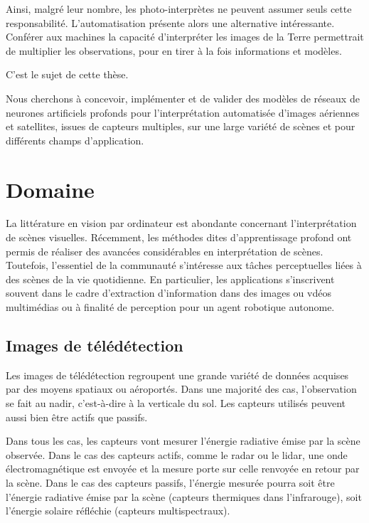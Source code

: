Ainsi, malgré leur nombre, les photo-interprètes ne peuvent assumer seuls cette responsabilité. L'automatisation présente alors une alternative intéressante. Conférer aux machines la capacité d'interpréter les images de la Terre permettrait de multiplier les observations, pour en tirer à la fois informations et modèles.

C'est le sujet de cette thèse.

Nous cherchons à concevoir, implémenter et de valider des modèles de réseaux de neurones artificiels profonds pour l'interprétation automatisée d'images aériennes et satellites, issues de capteurs multiples, sur une large variété de scènes et pour différents champs d'application.

\begin{figure}
    \centering
    \def\svgwidth{\columnwidth}
    
\end{figure}

\section{Domaine}

La littérature en vision par ordinateur est abondante concernant l'interprétation de scènes visuelles. Récemment, les méthodes dites d'apprentissage profond ont permis de réaliser des avancées considérables en interprétation de scènes. Toutefois, l'essentiel de la communauté s'intéresse aux tâches perceptuelles liées à des scènes de la vie quotidienne. En particulier, les applications s'inscrivent souvent dans le cadre d'extraction d'information dans des images ou vdéos multimédias ou à finalité de perception pour un agent robotique autonome.

\subsection{Images de télédétection}

Les images de télédétection regroupent une grande variété de données acquises par des moyens spatiaux ou aéroportés. Dans une majorité des cas, l'observation se fait au nadir, c'est-à-dire à la verticale du sol. Les capteurs utilisés peuvent aussi bien être actifs que passifs.

Dans tous les cas, les capteurs vont mesurer l'énergie radiative émise par la scène observée. Dans le cas des capteurs actifs, comme le radar ou le lidar, une onde électromagnétique est envoyée et la mesure porte sur celle renvoyée en retour par la scène. Dans le cas des capteurs passifs, l'énergie mesurée pourra soit être l'énergie radiative émise par la scène (capteurs thermiques dans l'infrarouge), soit l'énergie solaire réfléchie (capteurs multispectraux).


